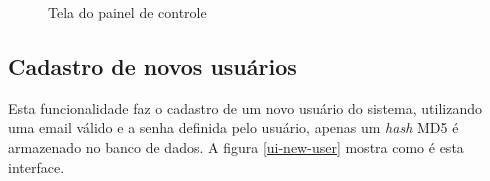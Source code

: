 \begin{figure}[H]
\caption{\label{ui-dashboard} Tela do painel de controle}
\end{figure}

\subsection{Cadastro de novos usuários}
Esta funcionalidade faz o cadastro de um novo usuário do sistema, utilizando uma email válido e a senha definida pelo usuário, apenas um \textit{hash} MD5 é armazenado no banco de dados. A figura \ref{ui-new-user} mostra como é esta interface.

